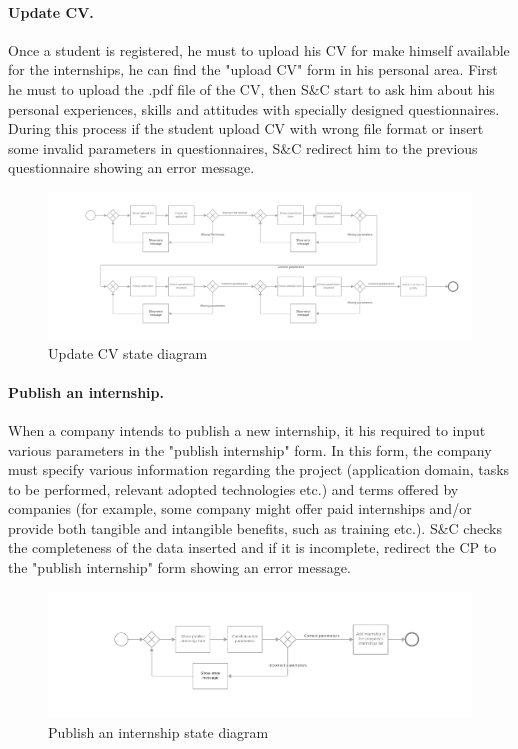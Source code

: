 \paragraph{Update CV.}
Once a student is registered, he must to upload his CV for make himself available for the internships, he can find the "upload CV" form in his personal area.
First he must to upload the .pdf file of the CV, then S\&C start to ask him about his personal experiences, skills and attitudes with specially designed questionnaires.
During this process if the student upload CV with wrong file format or insert some invalid parameters in questionnaires, S\&C redirect him to the previous questionnaire showing an error message. 

\begin{figure}[H]
    \begin{center}
        \includegraphics[width=1\linewidth]{RASD/LaTeX/Images/StateDiagrams/update_cv.png}
        \caption{Update CV state diagram}
        \label{fig:update_cv_sd}%
    \end{center}
\end{figure}

\paragraph{Publish an internship.}
When a company intends to publish a new internship, it his required to input various parameters in the "publish internship" form.
In this form, the company must specify various information regarding the project (application domain, tasks to be performed, relevant adopted technologies etc.) and terms offered by companies (for example, some company might offer paid internships and/or provide both tangible and intangible benefits, such as training etc.). 
S\&C checks the completeness of the data inserted and if it is incomplete, redirect the CP to the "publish internship" form showing an error message.

\begin{figure}[H]
    \begin{center}
        \includegraphics[width=1\linewidth]{RASD/LaTeX/Images/StateDiagrams/publish_an_internship.png}
        \caption{Publish an internship state diagram}
        \label{fig:publish_an_internship_sd}%
    \end{center}
\end{figure}

